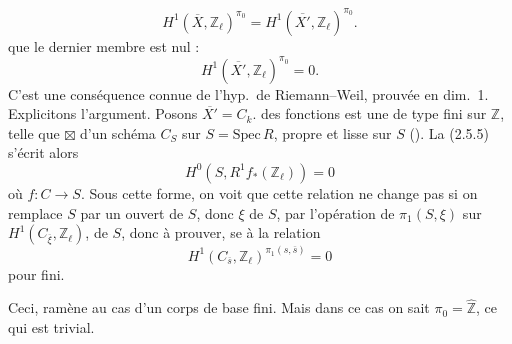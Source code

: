 \documentclass[11pt,a4paper]{article}
\begin{document}
\[
  H^1(\overline{X}, \mathbb{Z}_\ell)^{\pi_0} = H^1(\overline{X'}, \mathbb{Z}_\ell)^{\pi_0} . \tag{2.5.4}
\]
  que le dernier membre est nul :
\[
  H^1(\overline{X'}, \mathbb{Z}_\ell)^{\pi_0} = 0 . \tag{2.5.5}
\]
C'est une conséquence connue de l'hyp.\ de Riemann--Weil, prouvée en dim.~1. Explicitons l'argument.  Posons $\overline{X'} = C_k$.  \ill{} \ill{} \struck{\ill{}}  des fonctions est une \struck{\ill{}}  \ill{} \ill{} de type fini sur $\mathbb{Z}$, \struck{\ill{}} telle que \ill{} $\boxtimes$   d'un schéma $C_S$ sur $S = \mathrm{Spec}\,R$, propre et lisse sur $S$ (). \struck{\ill{}} La  \struck{\ill{}} (2.5.5) s'écrit alors
\[
  H^0(S, R^1 f_*(\mathbb{Z}_\ell)) = 0
\]
\add{\ill{}} où $f \colon C \to S$. Sous cette forme, on voit \struck{\ill{}} que cette relation \struck{\ill{}} ne change pas si on remplace $S$ par \struck{\ill{}} un ouvert \ill{} \struck{\ill{}}  de $S$, donc \ill{} \ill{} \ill{} \ill{}  $\xi$ de $S$, par \struck{\ill{}} \add{\ill{}} l'opération de $\pi_1(S,\xi)$ sur $H^1(C_{\overline{\xi}}, \mathbb{Z}_\ell)$, \struck{\ill{}}  \ill{} de $S$, donc \ill{} \ill{}   à prouver, \ill{} \ill{} se  à la relation
\[
  H^1(C_{\overline{s}}, \mathbb{Z}_\ell)^{\pi_1(s,\overline{s})} = 0 \tag{2.5.6}
\]
pour \struck{\ill{}} \ill{} fini.

Ceci, ramène au cas d'un corps de base fini. Mais dans ce cas on sait  $\pi_0 = \hat{\mathbb{Z}}$, 
 \ill{} ce qui est trivial.
\end{document}
